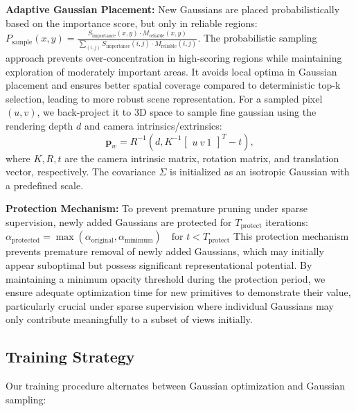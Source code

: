 \documentclass{article}
\begin{document}
  \noindent\textbf{Adaptive Gaussian Placement:} New Gaussians are placed probabilistically based on the importance score, but only in reliable regions:
  $P_{\text{sample}}(x,y) = \frac{S_{\text{importance}}(x,y) \cdot M_{\text{reliable}}(x,y)}{\sum_{(i,j)} S_{\text{importance}}(i,j) \cdot M_{\text{reliable}}(i,j)}$.
  The probabilistic sampling approach prevents over-concentration in high-scoring regions while maintaining exploration of moderately important areas. It avoids local optima in Gaussian placement and ensures better spatial coverage compared to deterministic top-k selection, leading to more robust scene representation. For a sampled pixel $(u,v)$, we back-project it to 3D space to sample fine gaussian using the rendering depth $d$ and camera intrinsics/extrinsics:
  \begin{equation}
    \mathbf{p}_w = R^{-1}\left(d,K^{-1}\begin{bmatrix}u\ v\ 1\end{bmatrix}^{T} - t\right), 
    \end{equation}
  where $K, R, t$ are the camera intrinsic matrix, rotation matrix, and translation vector, respectively. The covariance $\Sigma$ is initialized as an isotropic Gaussian with a predefined scale.
  
  \noindent\textbf{Protection Mechanism:} To prevent premature pruning under sparse supervision, newly added Gaussians are protected for $T_{\text{protect}}$ iterations: $\alpha_{\text{protected}} = \max(\alpha_{\text{original}}, \alpha_{\text{minimum}}) \quad \text{for } t < T_{\text{protect}}$
  This protection mechanism prevents premature removal of newly added Gaussians, which may initially appear suboptimal but possess significant representational potential. By maintaining a minimum opacity threshold during the protection period, we ensure adequate optimization time for new primitives to demonstrate their value, particularly crucial under sparse supervision where individual Gaussians may only contribute meaningfully to a subset of views initially.
  
  
  \subsection{Training Strategy}
  \label{subsec:ts}
  Our training procedure alternates between Gaussian optimization and Gaussian sampling:
  
\end{document}

